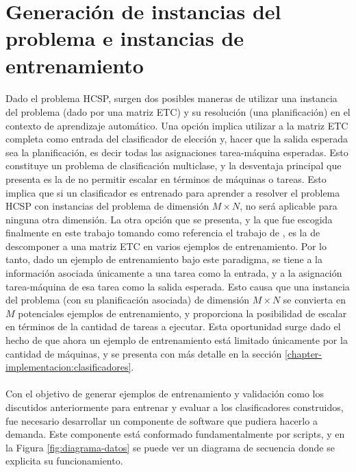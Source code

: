 \section{Generación de instancias del problema e instancias de entrenamiento} \label{chapter-implementacion:data}

\paragraph{} Dado el problema HCSP, surgen dos posibles maneras de utilizar una instancia del problema (dado por una matriz ETC) y su resolución (una planificación) en el contexto de aprendizaje automático. Una opción implica utilizar a la matriz ETC completa como entrada del clasificador de elección y, hacer que la salida esperada sea la planificación, es decir todas las asignaciones tarea-máquina esperadas. Esto constituye un problema de clasificación multiclase, y la desventaja principal que presenta es la de no permitir escalar en términos de máquinas o tareas. Esto implica que si un clasificador es entrenado para aprender a resolver el problema HCSP con instancias del problema de dimensión $M \times N$, no será aplicable para ninguna otra dimensión. La otra opción que se presenta, y la que fue escogida finalmente en este trabajo tomando como referencia el trabajo de \citet{savant-original}, es la de descomponer a una matriz ETC en varios ejemplos de entrenamiento. Por lo tanto, dado un ejemplo de entrenamiento bajo este paradigma, se tiene a la información asociada únicamente a una tarea como la entrada, y a la asignación tarea-máquina de esa tarea como la salida esperada. Esto causa que una instancia del problema (con su planificación asociada) de dimensión $M \times N$ se convierta en $M$ potenciales ejemplos de entrenamiento, y proporciona la posibilidad de escalar en términos de la cantidad de tareas a ejecutar. Esta oportunidad surge dado el hecho de que ahora un ejemplo de entrenamiento está limitado únicamente por la cantidad de máquinas, y se presenta con más detalle en la sección \ref{chapter-implementacion:clasificadores}.


\paragraph{} Con el objetivo de generar ejemplos de entrenamiento y validación como los discutidos anteriormente para entrenar y evaluar a los clasificadores construidos, fue necesario desarrollar un componente de software que pudiera hacerlo a demanda. Este componente está conformado fundamentalmente por scripts, y en la Figura \ref{fig:diagrama-datos} se puede ver un diagrama de secuencia donde se explicita su funcionamiento. 

